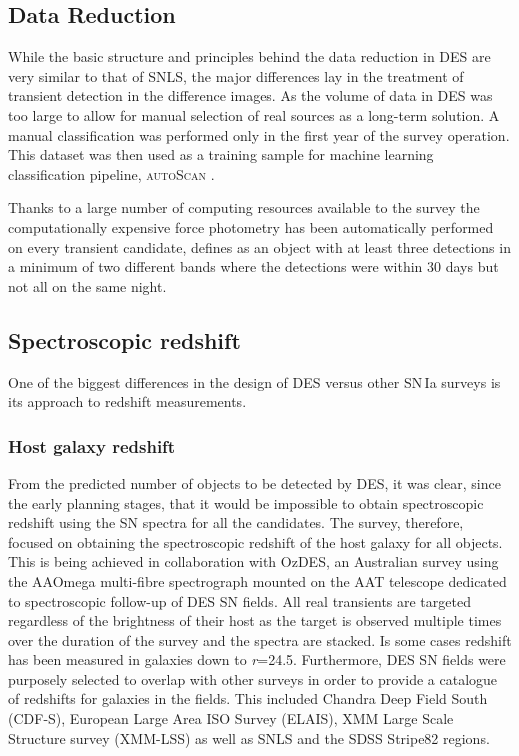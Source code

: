 \subsection{Data Reduction}
While the basic structure and principles behind the data reduction in DES are very similar to that of SNLS, the major differences lay in the treatment of transient detection in the difference images. As the volume of data in DES was too large to allow for manual selection of real sources as a long-term solution. A manual classification was performed only in the first year of the survey operation. This dataset was then used as a training sample for machine learning classification pipeline, \textsc{autoScan} \cite{Goldstein2015}.

Thanks to a large number of computing resources available to the survey the computationally expensive force photometry has been automatically performed on every transient candidate, defines as an object with at least three detections in a minimum of two different bands where the detections were within 30 days but not all on the same night.

\subsection{Spectroscopic redshift}
One of the biggest differences in the design of DES versus other SN\,Ia surveys is its approach to redshift measurements.

\subsubsection{Host galaxy redshift}
From the predicted number of objects to be detected by DES, it was clear, since the early planning stages, that it would be impossible to obtain spectroscopic redshift using the SN spectra for all the candidates. The survey, therefore, focused on obtaining the spectroscopic redshift of the host galaxy for all objects. This is being achieved in collaboration with OzDES, an Australian survey using the AAOmega multi-fibre spectrograph mounted on the AAT telescope dedicated to spectroscopic follow-up of DES SN fields. All real transients are targeted regardless of the brightness of their host as the target is observed multiple times over the duration of the survey and the spectra are stacked. Is some cases redshift has been measured in galaxies down to \textit{r}=24.5. Furthermore, DES SN fields were purposely selected to overlap with other surveys in order to provide a catalogue of redshifts for galaxies in the fields. This included Chandra Deep Field South (CDF-S), European Large Area ISO Survey (ELAIS), XMM Large Scale Structure survey (XMM-LSS) as well as SNLS and the SDSS Stripe82 regions.

